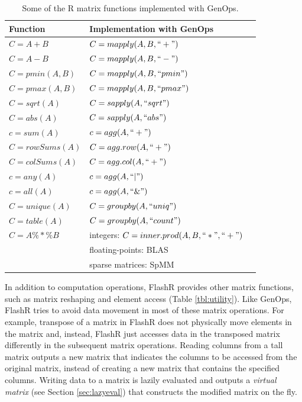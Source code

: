 \begin{table}
\begin{center}
\caption{Some of the R matrix functions implemented with GenOps.}
\vspace{-10pt}
\footnotesize
\begin{tabular}{|l|l|l|}
\hline
Function & Implementation with GenOps \\
\hline
$C=A+B$ & $C=mapply(A, B, ``+")$ \\
$C=A-B$ & $C=mapply(A, B, ``-")$ \\
$C=pmin(A,B)$ & $C=mapply(A, B, ``pmin")$ \\
$C=pmax(A,B)$ & $C=mapply(A, B, ``pmax")$ \\
$C=sqrt(A)$ & $C=sapply(A, ``sqrt")$ \\
$C=abs(A)$ & $C=sapply(A, ``abs")$ \\
\hline
$c=sum(A)$ & $c=agg(A, ``+")$ \\
$C=rowSums(A)$ & $C=agg.row(A, ``+")$ \\
$C=colSums(A)$ & $C=agg.col(A, ``+")$ \\
$c=any(A)$ & $c=agg(A, ``|")$ \\
$c=all(A)$ & $c=agg(A, ``\&")$ \\
\hline
$C=unique(A)$ & $C=groupby(A, ``uniq")$ \\
$C=table(A)$ & $C=groupby(A, ``count")$ \\
\hline
$C=A \%*\% B$ & integers: $C=inner.prod(A, B, ``*", ``+")$ \\
 & floating-points: BLAS \\
 & sparse matrices: SpMM \cite{SEM_SpMM} \\
\hline
\end{tabular}
\normalsize
\label{tbl:Rfuns}
\end{center}
\end{table}

In addition to computation operations, FlashR provides other matrix functions,
such as matrix reshaping and element access (Table \ref{tbl:utility}). Like
GenOps, FlashR tries to avoid data movement in most of these matrix operations.
For example, transpose of a matrix in
FlashR does not physically move elements in the matrix and, instead, FlashR
just accesses data in the transposed matrix differently in the subsequent
matrix operations. Reading columns from a tall matrix outputs a new matrix
that indicates the columns to be accessed from the original matrix, instead
of creating a new matrix that contains the specified columns. Writing data to
a matrix is lazily evaluated and outputs a \textit{virtual matrix} (see Section
\ref{sec:lazyeval}) that constructs the modified matrix on the fly.

